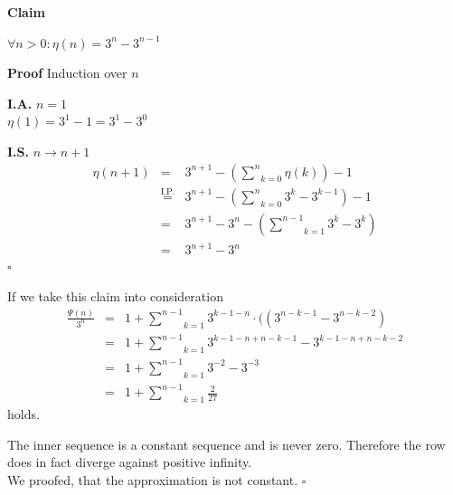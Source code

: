\documentclass[11pt,a4paper,ngerman]{article}
\newcommand{\claim}{\addtocounter{claims}{1} \bfseries Claim \arabic{claims}}
\newcommand{\proof}{\bfseries Proof}
\begin{document}
\begin{description}
\begin{description}
	\item{\claim} $\forall n > 0 : \eta (n) = 3^n - 3^{n-1}$
	\item{\proof} Induction over $n$\\
	\begin{description}
		\item{\bfseries I.A.} $n=1$\\
			$\eta (1) = 3^1 - 1 = 3^1 - 3^0$
		\item{\bfseries I.S.} $n \rightarrow n+1$\\
			$$
				\begin{array}{rcl}
					\eta(n+1) &=& 3^{n+1} - \left( \underset{k=0}{\overset{n}{\sum}} \eta (k) \right) - 1\\
						&\overset{\text{I.P.}}{=}& 3^{n+1} -  \left( \underset{k=0}{\overset{n}{\sum}} 3^k - 3^{k-1} \right) - 1\\
						&=& 3^{n+1} - 3^n - \left( \underset{k=1}{\overset{n-1}{\sum}} 3^k - 3^k \right)\\
						&=& 3^{n+1} - 3^n
				\end{array}
			$$
\mbox{}\hfill $\square$
	\end{description}
\end{description}

\pagebreak

If we take this claim into consideration
$$
\begin{array}{rcl}
\frac{\Psi(n)}{3^n} &=& 1 + \underset{k=1}{\overset{n-1}{\sum}} 3^{k - 1 - n} \cdot ( (3^{n-k-1} - 3^{n-k-2})\\
	&=& 1 + \underset{k=1}{\overset{n-1}{\sum}} 3^{k-1-n + n - k -1} - 3^{k - 1 - n + n - k -2}\\
	&=& 1 + \underset{k=1}{\overset{n-1}{\sum}} 3^{-2} - 3^{-3}\\
	&=& 1 + \underset{k=1}{\overset{n-1}{\sum}} \frac{2}{27}
\end{array}
$$
holds.

The inner sequence is a constant sequence and is never zero. Therefore the row does in fact diverge against positive infinity.\\

We proofed, that the approximation is not constant. \mbox{} \hfill $\square$

\end{description}



\end{document}
